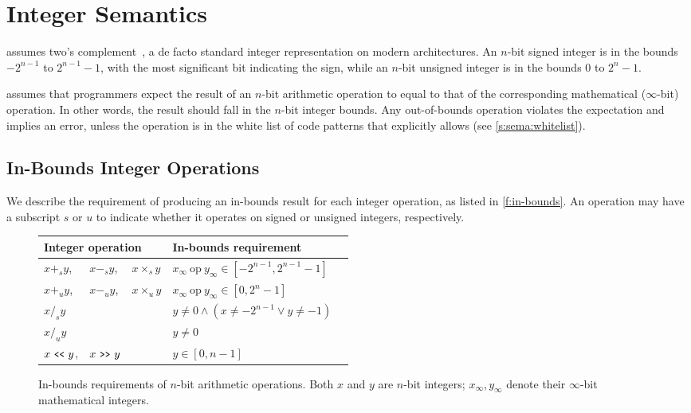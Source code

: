 \section{Integer Semantics}
\label{s:sema}

\sys assumes two's complement~\cite[4.2.1]{intel:vol1},
a de facto standard integer representation on modern architectures.
An $n$-bit signed integer is in the bounds $-2^{n-1}$ to $2^{n-1}-1$,
with the most significant bit indicating the sign,
while an $n$-bit unsigned integer is in the bounds $0$ to $2^n-1$.

\sys assumes that programmers expect the result of an $n$-bit
arithmetic operation to equal to that of the corresponding mathematical
($\infty$-bit) operation.
In other words, the result should fall in the $n$-bit integer bounds.
%
Any out-of-bounds operation violates the expectation and implies an
error, unless the operation is in the white list of code patterns
that \sys explicitly allows (see \autoref{s:sema:whitelist}).

\subsection{In-Bounds Integer Operations}
\label{s:sema:sec}

We describe the requirement of producing an in-bounds result for each
integer operation, as listed in \autoref{f:in-bounds}.
%
An operation may have a subscript $s$ or $u$ to indicate whether
it operates on signed or unsigned integers, respectively.

\begin{figure}
\small
\centering
\begin{tabular}{l@{ }l@{ }lll}\toprule
\multicolumn{3}{l}{Integer operation} & In-bounds requirement \\
\midrule
$x +_s y$, & $x -_s y$, & $x \times_s y$
& $x_{\infty}\ \textrm{op}\ y_{\infty} \in [-2^{n-1}, 2^{n-1}-1]$
\\
$x +_u y$, & $x -_u y$, & $x \times_u y$
& $x_{\infty}\ \textrm{op}\ y_{\infty} \in [0, 2^n-1]$
\\
$x /_s y$ & &
& $y \neq 0 \land (x \neq -2^{n-1} \lor y \neq -1) $
\\
$x /_u y$ & &
& $y \neq 0$
\\
$ x \shl y$, & $x \shr y$ &
& $y \in [0, n-1]$
\\
\bottomrule
\end{tabular}
\caption{In-bounds requirements of $n$-bit arithmetic operations.
Both $x$ and $y$ are $n$-bit integers; $x_{\infty}, y_{\infty}$
denote their $\infty$-bit mathematical integers.}
\label{f:in-bounds}
\end{figure}

